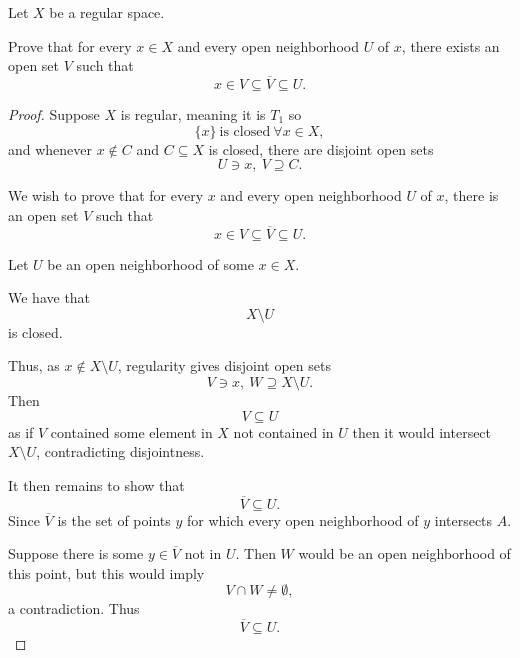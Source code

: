 \documentclass[11pt]{article}
\begin{document}
\begin{prob}
    Let $X$ be a regular space. 

    Prove that for every $x \in X$ and 
    every open neighborhood $U$ of $x$, 
    there exists an open set $V$ such that 
    \[
        x \in V \subseteq \overline V \subseteq U. 
    \]
\end{prob}
\begin{proof}
    Suppose $X$ is regular, meaning 
    it is $T_1$ so 
    \[
        \{x\} \ \text{is closed} \ \forall x \in X, 
    \]
    and whenever $x \not\in C$ and $C \subseteq X$ is 
    closed, there are disjoint open sets 
    \[
        U \ni x, \ V \supseteq C. 
    \]

    We wish to prove that for every $x$ and 
    every open neighborhood $U$ of $x$, there 
    is an open set $V$ such that 
    \[
        x \in V \subseteq \overline V \subseteq U.
    \]

    Let $U$ be an open neighborhood of some $x \in X$. 

    We have that 
    \[
        X \setminus U 
    \]
    is closed. 

    Thus, as $x \not\in X \setminus U$, regularity gives 
    disjoint open sets 
    \[
        V \ni x, \ W \supseteq X \setminus U. 
    \]
    Then 
    \[
        V \subseteq U 
    \]
    as if $V$ contained some element in 
    $X$ not contained in $U$ then 
    it would intersect $X \setminus U$, contradicting 
    disjointness. 

    It then remains to show that 
    \[
        \overline V \subseteq U. 
    \]
    Since $\overline V$ is the set of points 
    $y$ for which every open neighborhood 
    of $y$ intersects $A$. 

    Suppose there is some $y \in \overline V$ 
    not in $U$. Then $W$ would be an open neighborhood of 
    this point, but this would imply 
    \[
        V \cap W \neq \emptyset, 
    \]
    a contradiction. Thus 
    \[
        \overline V \subseteq U. 
    \]

\end{proof}
\end{document}
